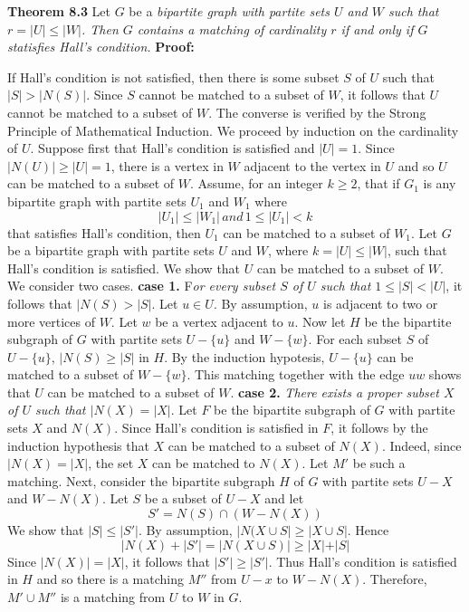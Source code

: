 \nopagenumbers
{\bf Theorem 8.3}
\vskip 6pt
Let $G$ be a {\it bipartite graph with partite sets $U$ and $W$ such that $r=|U| \leq |W|$. Then $G$ contains a matching of cardinality $r$ if and only if $G$ statisfies Hall's condition.}
\vskip 10pt
{\bf Proof:}
\vskip 6pt

If Hall's condition is not satisfied, then there is some subset $S$ of $U$ such that $|S| > |N(S)|$. Since $S$ cannot be matched to a subset of $W$, it follows that $U$ cannot be matched to a subset of $W$.
\vskip 1mm
The converse is verified by the Strong Principle of Mathematical Induction. We proceed by induction on the cardinality of $U$. Suppose first that Hall's condition is satisfied and $|U|=1$.
Since $|N(U)| \geq |U|=1$, there is a vertex in $W$ adjacent to the vertex in $U$ and so $U$ can be matched to a subset of $W$. Assume, for an integer $k \geq 2$, that if $G_1$ is any bipartite graph with partite
sets $U_1$ and $W_1$ where $${|U_1| \leq |W_1| \,and \, 1 \leq |U_1| < k}$$ that satisfies Hall's condition, then $U_1$ can be matched to a subset of $W_1$. Let $G$ be a bipartite graph with partite sets $U$
and $W$, where $k=|U| \leq |W|$, such that Hall's condition is satisfied. We show that $U$ can be matched to a subset of $W$. We consider two cases.
\vskip 1mm
{\bf case 1.} F{\it or every subset $S$ of $U$ such that $1 \leq |S| < |U|$}, it follows that $|N(S) > |S|$. Let $u \in U$. By assumption, $u$ is adjacent to two or more vertices of $W$. Let $w$ be a vertex adjacent
to $u$. Now let $H$ be the bipartite subgraph of $G$ with partite sets $U-\lbrace u \rbrace$ and $W- \lbrace w \rbrace$. For each subset $S$ of $U- \lbrace u \rbrace$, $|N(S) \geq |S|$ in $H$. By the induction
hypotesis, $U- \lbrace u \rbrace$ can be matched to a subset of $W- \lbrace w \rbrace$. This matching together with the edge $uw$ shows that $U$ can be matched to a subset of $W$.
\vskip 1mm
{\bf case 2.} {\it There exists a proper subset $X$ of $U$ such that $|N(X)=|X|$}. Let $F$ be the bipartite subgraph of $G$ with partite sets $X$ and $N(X)$. Since Hall's condition is satisfied in $F$, it
follows by the induction hypothesis that $X$ can be matched to a subset of $N(X)$. Indeed, since $|N(X)=|X|$, the set $X$ can be matched to $N(X)$. Let $M'$ be such a matching.
\vskip 1mm
Next, consider the bipartite subgraph $H$ of $G$ with partite sets $U-X$ and $W-N(X)$. Let $S$ be a subset of $U-X$ and let $$S'=N(S) \cap (W-N(X))$$ We show that $|S| \leq |S'|$. By assumption,
$|N(X \cup S| \geq |X \cup S|$. Hence $$|N(X)+|S'|=|N(X \cup S)| \geq |X| + |S|$$ Since $|N(X)|=|X|$, it follows that $|S'| \geq |S'|$. Thus Hall's condition is satisfied in $H$ and so there is a matching
$M''$ from $U-x$ to $W-N(X)$. Therefore, $M' \cup M''$ is a matching from $U$ to $W$ in $G$.

\vfill\eject
